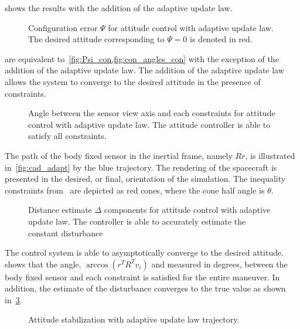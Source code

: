  shows the results with the addition of the adaptive update law.
\begin{figure}[htbp]
    \centering
    
    \caption{Configuration error \( \Psi \) for attitude control with adaptive update law.
    The desired attitude corresponding to \( \Psi = 0 \) is denoted in red.\label{fig:Psi_adapt}}
\end{figure}
 are equivalent to~\cref{fig:Psi_con,fig:con_angles_con} with the exception of the addition of the adaptive update law.
The addition of the adaptive update law allows the system to converge to the desired attitude in the presence of constraints.
\begin{figure}[htbp]
    \centering
    
    \caption{Angle between the sensor view axis and each constraints for attitude control with adaptive update law.
    The attitude controller is able to satisfy all constraints. \label{fig:con_angles}}
\end{figure}
The path of the body fixed sensor in the inertial frame, namely \( R r \), is illustrated in~\cref{fig:cad_adapt} by the blue trajectory.
The rendering of the spacecraft is presented in the desired, or final, orientation of the simulation.
The inequality constraints from~ are depicted as red cones, where the cone half angle is \( \theta \).
\begin{figure}[htbp]
    \centering
    
    \caption{Distance estimate \( \Delta \) components for attitude control with adaptive update law.
    The controller is able to accurately estimate the constant disturbance\label{fig:delta_adapt}}
\end{figure}
The control system is able to asymptotically converge to the desired attitude.
 shows that the angle, \( \arccos(r^T R^T v_i) \) and measured in degrees, between the body fixed sensor and each constraint is satisfied for the entire maneuver.
In addition, the estimate of the disturbance converges to the true value as shown in~\cref{fig:delta_adapt}.
\begin{figure}[htbp]
  \centering 
  \caption{Attitude stabilization with adaptive update law trajectory.}
  \label{fig:adapt} 
\end{figure}

